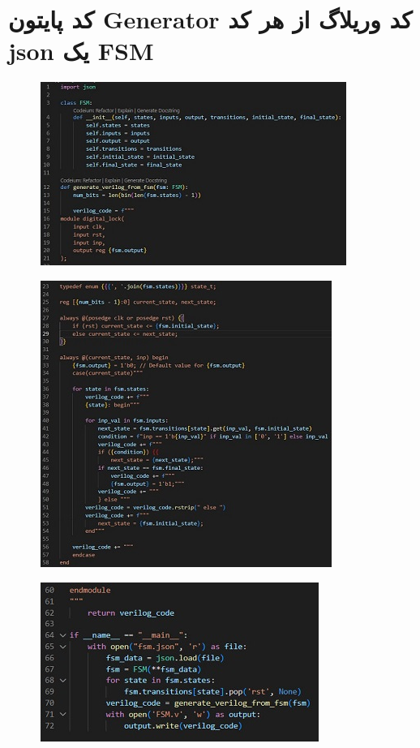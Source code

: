 \newpage

\section*{کد پایتون Generator کد وریلاگ از هر کد json یک FSM}

\begin{figure}[H]
	\centering
	\includegraphics{4.jpg}
	\label{fig:label4}
\end{figure}

\begin{figure}[H]
	\centering
	\includegraphics{5.jpg}
	\label{fig:label4}
\end{figure}

\begin{figure}[H]
	\centering
	\includegraphics{6.jpg}
	\label{fig:label4}
\end{figure}

